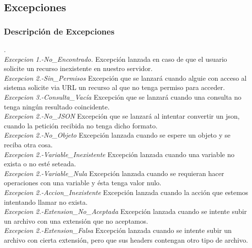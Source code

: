 	
\subsection{Excepciones}
	\subsubsection{Descripción de Excepciones}
	.\\
	\textit{Excepcion 1.-No\_Encontrado. } Excepción lanzada en caso de que el usuario solicite un recurso inexistente en nuestro servidor. \\  
	\textit{Excepcion 2.-Sin\_Permisos} Excepción que se lanzará cuando alguie con acceso al sistema solicite via URL un recurso al que no tenga permiso para acceder. \\
	\textit{Excepcion 3.-Consulta\_Vacía} Excepción que se lanzará cuando una consulta no tenga ningún resultado coincidente. \\
	\textit{Excepcion 2.-No\_JSON} Excepción que se lanzará al intentar convertir un json, cuando la petición recibida no tenga dicho formato. \\
	\textit{Excepcion 2.-No\_Objeto} Excepción lanzada cuando se espere un objeto y se reciba otra cosa. \\
	\textit{Excepcion 2.-Variable\_Inexistente} Excepción lanzada cuando una variable no exista o no esté seteada. \\
	\textit{Excepcion 2.-Variable\_Nula} Excepción lanzada cuando se requieran hacer operaciones con una variable y ésta tenga valor nulo. \\
	\textit{Excepcion 2.-Accion\_Inexistente} Excepción lanzada cuando la acción que estemos intentando llamar no exista. \\
	\textit{Excepcion 2.-Extension\_No\_Aceptada} Excepción lanzada cuando se intente subir un archivo con una extensión que no aceptamos. \\
	\textit{Excepcion 2.-Extension\_Falsa} Excepción lanzada cuando se intente subir un archivo con cierta extensión, pero que sus headers contengan otro tipo de archivo. \\
    
